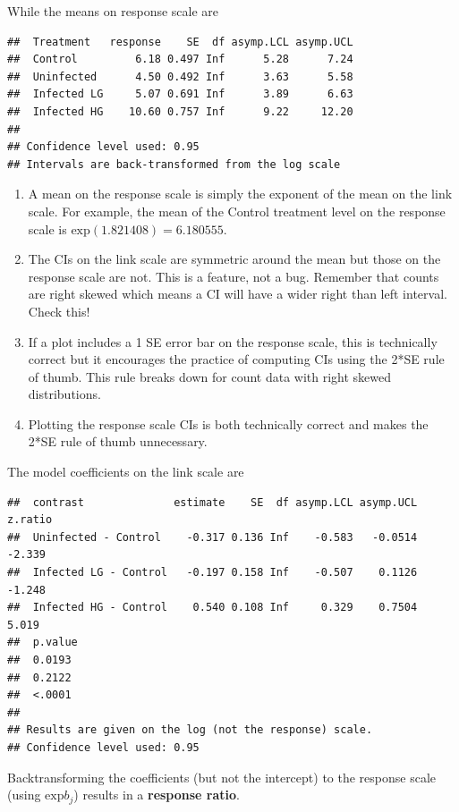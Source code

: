 \documentclass[]{book}
\begin{document}
While the means on response scale are

\begin{verbatim}
##  Treatment   response    SE  df asymp.LCL asymp.UCL
##  Control         6.18 0.497 Inf      5.28      7.24
##  Uninfected      4.50 0.492 Inf      3.63      5.58
##  Infected LG     5.07 0.691 Inf      3.89      6.63
##  Infected HG    10.60 0.757 Inf      9.22     12.20
## 
## Confidence level used: 0.95 
## Intervals are back-transformed from the log scale
\end{verbatim}

\begin{enumerate}
\def\labelenumi{\arabic{enumi}.}
\item
  A mean on the response scale is simply the exponent of the mean on the
  link scale. For example, the mean of the Control treatment level on
  the response scale is \(\mathrm{exp}(1.821408) = 6.180555\).
\item
  The CIs on the link scale are symmetric around the mean but those on
  the response scale are not. This is a feature, not a bug. Remember
  that counts are right skewed which means a CI will have a wider right
  than left interval. Check this!
\item
  If a plot includes a 1 SE error bar on the response scale, this is
  technically correct but it encourages the practice of computing CIs
  using the 2*SE rule of thumb. This rule breaks down for count data
  with right skewed distributions.
\item
  Plotting the response scale CIs is both technically correct and makes
  the 2*SE rule of thumb unnecessary.
\end{enumerate}

The model coefficients on the link scale are

\begin{verbatim}
##  contrast              estimate    SE  df asymp.LCL asymp.UCL z.ratio
##  Uninfected - Control    -0.317 0.136 Inf    -0.583   -0.0514 -2.339 
##  Infected LG - Control   -0.197 0.158 Inf    -0.507    0.1126 -1.248 
##  Infected HG - Control    0.540 0.108 Inf     0.329    0.7504  5.019 
##  p.value
##  0.0193 
##  0.2122 
##  <.0001 
## 
## Results are given on the log (not the response) scale. 
## Confidence level used: 0.95
\end{verbatim}

Backtransforming the coefficients (but not the intercept) to the
response scale (using \(\mathrm{exp}{b_j}\)) results in a
\textbf{response ratio}.
\end{document}
